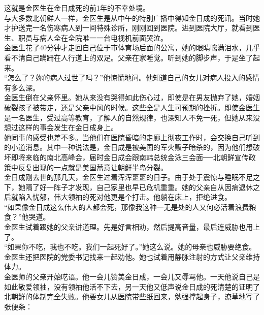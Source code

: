 这就是金医生在金日成死的前1年的不幸处境。\\

与大多数北朝鲜人一样，金医生是从中午的特别广播中得知金日成的死讯。当时她才护送完一名伤寒病人到一间特殊诊所，刚刚回到医院。进到医院大厅，就看到医生、职员与病人全在全院唯一一台电视机前面哭泣。\\

金医生花了40分钟才走回自己位于市体育场后面的公寓，她的眼睛噙满泪水，几乎看不清自己蹒跚在人行道上的双足。父亲在家睡觉。听到她的脚步声，于是坐了起来。\\

“怎么了？妳的病人过世了吗？”他惊慌地问。他知道自己的女儿对病人投入的感情有多么深。\\

金医生倒在父亲怀里。她从来没有哭得如此伤心过，即使是在男友抛弃了她，婚姻破裂孩子被带走，还是父亲中风的时候。这些全是人生可预期的挫折。即使金医生是一名医生，受过高等教育，了解人的自然规律，也深知人不免一死，但她从来没想过这样的事会发生在金日成身上。\\

她同事的感受也差不多。当他们在医院昏暗的走廊上彻夜工作时，会交换自己听到的小道消息。其中一种说法是，金日成是被美国的军火贩子暗杀的，因为他们想破坏即将来临的南北高峰会，届时金日成会跟南韩总统金泳三会面──北朝鲜宣传政策中反复出现的一点就是美国蓄意让朝鲜半岛分裂。\\

金日成刚去世的那几天，金医生过着浑浑噩噩的日子。由于处于震惊与睡眠不足之下，她隔了好一阵子才发现，自己家里也早已危机重重。她的父亲自从因病退休之后就陷入忧郁，伟大领袖的死对他更是个打击。他躺在床上，拒绝进食。\\

“如果像金日成这么伟大的人都会死，那像我这种一无是处的人又何必活着浪费粮食？”他哭道。\\

金医生试着跟她的父亲讲道理。先是好言相劝，然后提高音量，最后连威胁也用上了。\\

“如果你不吃，我也不吃。我们一起死好了。”她这么说。她的母亲也威胁要绝食。金医生还把医院的党委书记找来一起劝他。她也试着用静脉注射的方式让父亲维持体力。\\

金医师的父亲开始呓语。他一会儿赞美金日成，一会儿又辱骂他。一天他说自己是如此敬爱领袖，没有领袖他活不下去，另一天他又低声说金日成的死清楚的证明了北朝鲜的体制完全失败。他要女儿从医院带些纸回来，勉强撑起身子，潦草地写了张便条：\\

